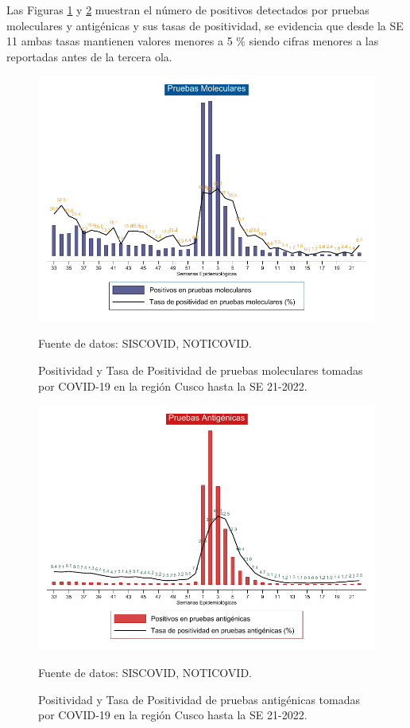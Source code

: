 \documentclass[12pt,a4paper,openany]{book}
\begin{document}
	
	
	
	Las Figuras \ref{fig:positividad_pcr} y \ref{fig:positividad_ag} muestran el número de positivos detectados por pruebas moleculares y antigénicas y sus tasas de positividad, se evidencia que desde la SE 11 ambas tasas mantienen valores menores a 5 $\%$ siendo cifras menores a las reportadas antes de la tercera ola. 
	
	
	\begin{landscape}
		\begin{figure}[h]
			\caption{Positividad y Tasa de Positividad de pruebas moleculares tomadas por COVID-19 en la región Cusco hasta la SE 21-2022.}\label{fig:positividad_pcr}
			\begin{center}
				\includegraphics[width=0.90\linewidth]{../figuras/positividad_pcr.pdf}
			\end{center}
			{\footnotesize {Fuente de datos: SISCOVID, NOTICOVID.}}
		\end{figure}
	\end{landscape}
	\clearpage
	\begin{landscape}
		
		\begin{figure}[h]
			\caption{ Positividad y Tasa de Positividad de pruebas antigénicas tomadas por COVID-19 en la región Cusco hasta la SE 21-2022.}\label{fig:positividad_ag}
			\begin{center}
				\includegraphics[width=0.90\linewidth]{../figuras/positividad_ag.pdf}
			\end{center}
			{\footnotesize {Fuente de datos: SISCOVID, NOTICOVID.}}
		\end{figure}
	\end{landscape}
\end{document}
